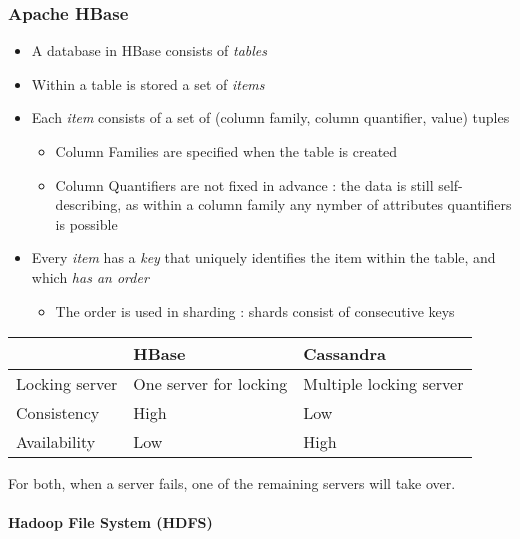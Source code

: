 \subsubsection{Apache HBase}

\begin{itemize}
    \item A database in HBase consists of \textit{tables}
    \item Within a table is stored a set of \textit{items}
    \item Each \textit{item} consists of a set of (column family, column quantifier, value) tuples
    \begin{itemize}
        \item Column Families are specified when the table is created
        \item Column Quantifiers are not fixed in advance : the data is still self-describing, as within a column family any nymber of attributes quantifiers is possible
    \end{itemize}
    \item Every \textit{item} has a \textit{key} that uniquely identifies the item within the table, and which \textit{has an order}
    \begin{itemize}
        \item The order is used in sharding : shards consist of consecutive keys
    \end{itemize}
\end{itemize}

\begin{center}
\begin{tabular}{|l|l|l|}
\hline 
  & HBase & Cassandra \\ 
\hline 
Locking server & One server for locking & Multiple locking server \\ 
\hline 
Consistency & High & Low \\ 
\hline 
Availability & Low & High \\ 
\hline 
\end{tabular} 
\end{center}

For both, when a server fails, one of the remaining servers will take over.

\newpage
\paragraph{Hadoop File System (HDFS)}

